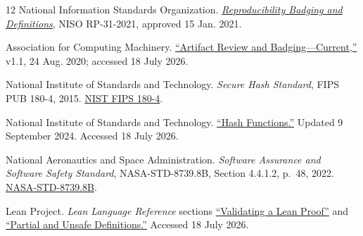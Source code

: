 \documentclass[11pt]{article}
\begin{document}
\begin{thebibliography}{12}
National Information Standards Organization.
\href{https://doi.org/10.3789/niso-rp-31-2021}{\emph{Reproducibility Badging
and Definitions}},
NISO RP-31-2021, approved 15 Jan. 2021.

Association for Computing Machinery.
\href{https://www.acm.org/publications/policies/artifact-review-and-badging-current}{``Artifact Review and Badging---Current,''}
v1.1, 24 Aug. 2020; accessed 18 July 2026.

National Institute of Standards and Technology. \emph{Secure Hash Standard},
FIPS PUB 180-4, 2015.
\href{https://doi.org/10.6028/NIST.FIPS.180-4}{NIST FIPS 180-4}.

National Institute of Standards and Technology.
\href{https://csrc.nist.gov/projects/hash-functions}{``Hash Functions.''}
Updated 9 September 2024. Accessed 18 July 2026.

National Aeronautics and Space Administration.
\emph{Software Assurance and Software Safety Standard},
NASA-STD-8739.8B, Section 4.4.1.2, p.~48, 2022.
\href{https://standards.nasa.gov/standard/NASA/NASA-STD-87398}{NASA-STD-8739.8B}.

Lean Project. \emph{Lean Language Reference} sections
\href{https://lean-lang.org/doc/reference/latest/ValidatingProofs/}{``Validating a Lean Proof''} and
\href{https://lean-lang.org/doc/reference/latest/Definitions/Recursive-Definitions/#partial-and-unsafe-definitions}{``Partial and Unsafe Definitions.''}
Accessed 18 July 2026.

\end{thebibliography}
\end{document}
